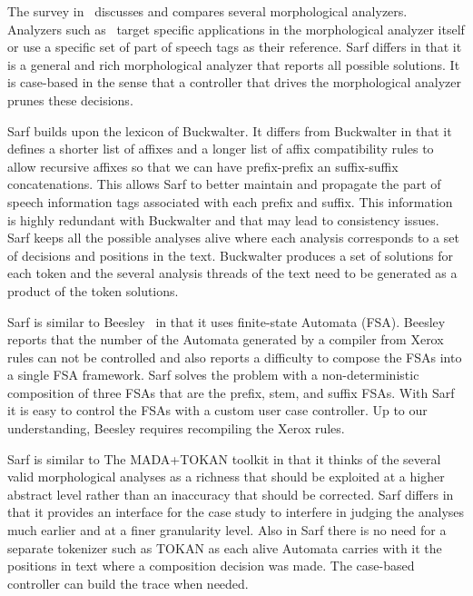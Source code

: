 \documentclass[11pt,letterpaper]{article}
\begin{document}
The survey in~\cite{Sughaiyer:04} discusses and compares
several morphological analyzers. 
Analyzers such as~\cite{Khoja:01,Darwish:02} 
target specific applications in the morphological 
analyzer itself or use a specific set of part of speech tags
as their reference.
Sarf differs in that it is a general and rich morphological 
analyzer that reports all possible solutions. 
It is case-based in the sense that a controller that drives
the morphological analyzer prunes these decisions. 

Sarf builds upon the lexicon of Buckwalter.
It differs from Buckwalter in that it defines a shorter list of affixes
and a longer list of affix compatibility rules to allow recursive 
affixes so that we can have prefix-prefix an suffix-suffix 
concatenations.
This allows Sarf to better maintain and propagate 
the part of speech information
tags associated with each prefix and suffix.
This information is highly 
redundant with Buckwalter and that may lead to consistency issues. 
Sarf keeps all the possible analyses alive where each analysis
corresponds to a set of decisions and positions in the text. 
Buckwalter produces a set of solutions for each token 
and the several analysis threads of the text need to be 
generated as a product of the token solutions. 

Sarf is similar to Beesley~ in that it uses
finite-state Automata (FSA). 
Beesley reports that the number of the Automata generated by a compiler
from Xerox rules can not be controlled and also reports a difficulty to 
compose the FSAs into a single FSA framework. 
Sarf solves the problem with a non-deterministic composition of three
FSAs that are the prefix, stem, and suffix FSAs. 
With Sarf it is easy to control the FSAs with a custom user case 
controller. Up to our understanding, Beesley  
requires recompiling the Xerox rules.

Sarf is similar to The MADA+TOKAN toolkit in that it thinks of
the several valid morphological analyses as a richness that 
should be exploited at a higher abstract level rather than
an inaccuracy that should be corrected. 
Sarf differs in that it provides an interface for the 
case study to interfere in judging the analyses much earlier and
at a finer granularity level. 
Also in Sarf there is no need for a separate tokenizer such as
TOKAN as each alive Automata carries with it the positions in 
text where a composition decision was made. 
The case-based controller can build the trace 
when needed. 
\end{document}
